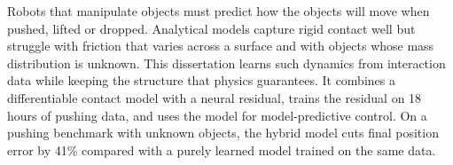 Robots that manipulate objects must predict how the objects will move when pushed, lifted or
dropped. Analytical models capture rigid contact well but struggle with friction that varies
across a surface and with objects whose mass distribution is unknown. This dissertation learns
such dynamics from interaction data while keeping the structure that physics guarantees. It
combines a differentiable contact model with a neural residual, trains the residual on 18 hours
of pushing data, and uses the model for model-predictive control. On a pushing benchmark with
unknown objects, the hybrid model cuts final position error by 41\% compared with a purely
learned model trained on the same data.
